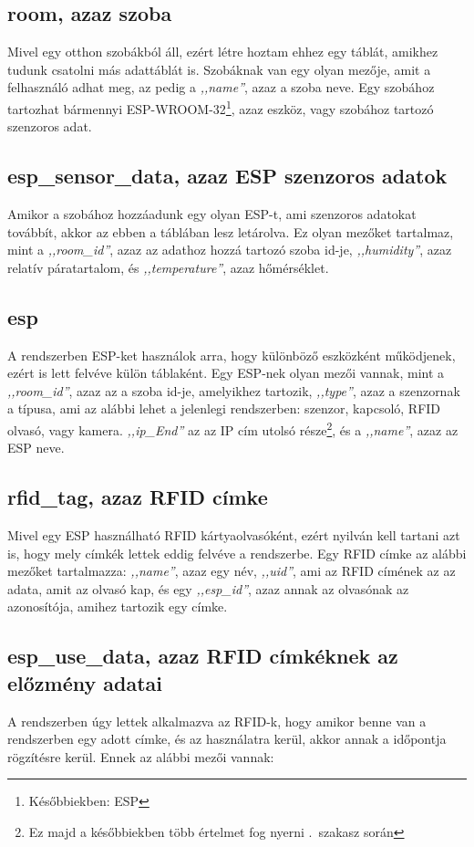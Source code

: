 \documentclass[
]{thesis-ekf}
\theoremstyle{definition}
\theoremstyle{remark}
\begin{document}
	\subsection*{room, azaz szoba}
	Mivel egy otthon szobákból áll, ezért létre hoztam ehhez egy táblát, amikhez tudunk csatolni más adattáblát is. Szobáknak van egy olyan mezője, amit a felhasználó adhat meg, az pedig a \emph{,,name''}, azaz a szoba neve. Egy szobához tartozhat bármennyi ESP-WROOM-32\footnote{Későbbiekben: ESP}, azaz eszköz, vagy szobához tartozó szenzoros adat.
	
	\subsection*{esp\_sensor\_data, azaz ESP szenzoros adatok}
	Amikor a szobához hozzáadunk egy olyan ESP-t, ami szenzoros adatokat továbbít, akkor az ebben a táblában lesz letárolva. Ez olyan mezőket tartalmaz, mint a \emph{,,room\_id''}, azaz az adathoz hozzá tartozó szoba id-je, \emph{,,humidity''}, azaz relatív páratartalom, és \emph{,,temperature''}, azaz hőmérséklet.
	
	\subsection*{esp}
	A rendszerben ESP-ket használok arra, hogy különböző eszközként működjenek, ezért is lett felvéve külön táblaként. Egy ESP-nek olyan mezői vannak, mint a \emph{,,room\_id''}, azaz az a szoba id-je, amelyikhez tartozik, \emph{,,type''}, azaz a szenzornak a típusa, ami az alábbi lehet a jelenlegi rendszerben: szenzor, kapcsoló, RFID olvasó, vagy kamera.  \emph{,,ip\_End''} az az IP cím utolsó része\footnote{Ez majd a későbbiekben több értelmet fog nyerni .~szakasz során}, és a \emph{,,name''}, azaz az ESP neve.
	
	\subsection*{rfid\_tag, azaz RFID címke}
	Mivel egy ESP használható RFID kártyaolvasóként, ezért nyilván kell tartani azt is, hogy mely címkék lettek eddig felvéve a rendszerbe. Egy RFID címke az alábbi mezőket tartalmazza: \emph{,,name''}, azaz egy név, \emph{,,uid''}, ami az RFID címének az az adata, amit az olvasó kap, és egy \emph{,,esp\_id''}, azaz annak az olvasónak az azonosítója, amihez tartozik egy címke.
	
	\subsection*{esp\_use\_data, azaz RFID címkéknek az előzmény adatai}
	A rendszerben úgy lettek alkalmazva az RFID-k, hogy amikor benne van a rendszerben egy adott címke, és az használatra kerül, akkor annak a időpontja rögzítésre kerül. Ennek az alábbi mezői vannak: 
	
\end{document}
